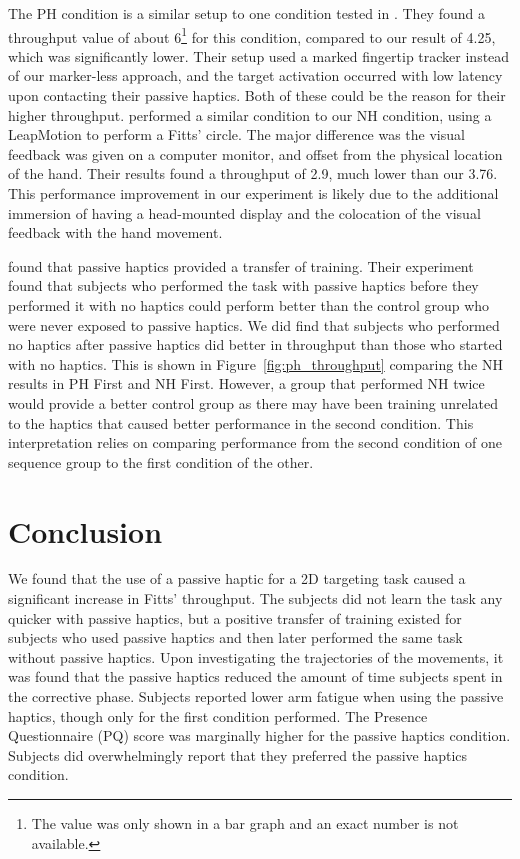 The PH condition is a similar setup to one condition tested in \citet{kohli_redirected_2012}.
They found a throughput value of about \SI{6}{\bps}\footnote{The value was only shown in a bar graph and an exact number is not available.} for this condition, compared to our result of \SI{4.25}{\bps}, which was significantly lower.
Their setup used a marked fingertip tracker instead of our marker-less approach, and the target activation occurred with low latency upon contacting their passive haptics.
Both of these could be the reason for their higher throughput.
\citet{seixas_one_2015} performed a similar condition to our NH condition, using a LeapMotion to perform a Fitts' circle.
The major difference was the visual feedback was given on a computer monitor, and offset from the physical location of the hand.
Their results found a throughput of \SI{2.9}{\bps}, much lower than our \SI{3.76}{\bps}.
This performance improvement in our experiment is likely due to the additional immersion of having a head-mounted display and the colocation of the visual feedback with the hand movement.

\citet{insko_passive_2001} found that passive haptics provided a transfer of training.
Their experiment found that subjects who performed the task with passive haptics before they performed it with no haptics could perform better than the control group who were never exposed to passive haptics.
We did find that subjects who performed no haptics after passive haptics did better in throughput than those who started with no haptics.
This is shown in Figure~\ref{fig:ph_throughput} comparing the NH results in PH First and NH First.
However, a group that performed NH twice would provide a better control group as there may have been training unrelated to the haptics that caused better performance in the second condition.
This interpretation relies on comparing performance from the second condition of one sequence group to the first condition of the other.

\section{Conclusion}

We found that the use of a passive haptic for a 2D targeting task caused a significant increase in Fitts' throughput.
The subjects did not learn the task any quicker with passive haptics, but a positive transfer of training existed for subjects who used passive haptics and then later performed the same task without passive haptics.
Upon investigating the trajectories of the movements, it was found that the passive haptics reduced the amount of time subjects spent in the corrective phase.
Subjects reported lower arm fatigue when using the passive haptics, though only for the first condition performed.
The Presence Questionnaire (PQ) score was marginally higher for the passive haptics condition.
Subjects did overwhelmingly report that they preferred the passive haptics condition.


